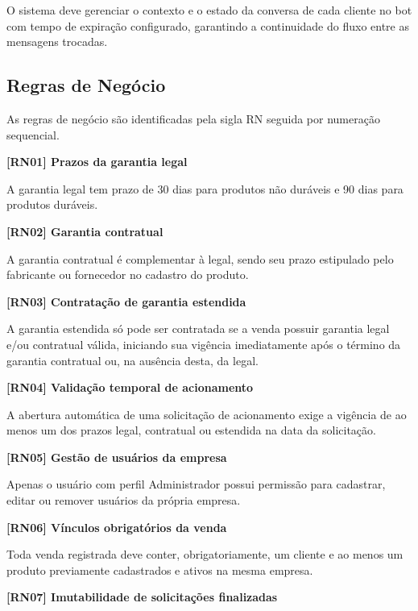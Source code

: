 O sistema deve gerenciar o contexto e o estado da conversa de cada cliente no bot com tempo de expiração configurado, garantindo a continuidade do fluxo entre as mensagens trocadas.

\subsection{Regras de Negócio}
As regras de negócio são identificadas pela sigla RN seguida por numeração sequencial.

\vspace{\baselineskip}
\noindent\textbf{[RN01] Prazos da garantia legal}

A garantia legal tem prazo de 30 dias para produtos não duráveis e 90 dias para produtos duráveis.

\vspace{\baselineskip}
\noindent\textbf{[RN02] Garantia contratual}

A garantia contratual é complementar à legal, sendo seu prazo estipulado pelo fabricante ou fornecedor no cadastro do produto.

\vspace{\baselineskip}
\noindent\textbf{[RN03] Contratação de garantia estendida}

A garantia estendida só pode ser contratada se a venda possuir garantia legal e/ou contratual válida, iniciando sua vigência imediatamente após o término da garantia contratual ou, na ausência desta, da legal.

\vspace{\baselineskip}
\noindent\textbf{[RN04] Validação temporal de acionamento}

A abertura automática de uma solicitação de acionamento exige a vigência de ao menos um dos prazos legal, contratual ou estendida na data da solicitação.

\vspace{\baselineskip}
\noindent\textbf{[RN05] Gestão de usuários da empresa}

Apenas o usuário com perfil Administrador possui permissão para cadastrar, editar ou remover usuários da própria empresa.

\vspace{\baselineskip}
\noindent\textbf{[RN06] Vínculos obrigatórios da venda}

Toda venda registrada deve conter, obrigatoriamente, um cliente e ao menos um produto previamente cadastrados e ativos na mesma empresa.

\vspace{\baselineskip}
\noindent\textbf{[RN07] Imutabilidade de solicitações finalizadas}

